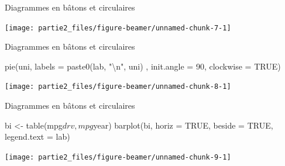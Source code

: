 \documentclass[12pt,ignorenonframetext,]{beamer}
\newenvironment{Shaded}{}{}
\newcommand{\KeywordTok}[1]{\textcolor[rgb]{0.00,0.00,1.00}{#1}}
\newcommand{\DataTypeTok}[1]{#1}
\newcommand{\DecValTok}[1]{#1}
\newcommand{\CharTok}[1]{\textcolor[rgb]{0.00,0.50,0.50}{#1}}
\newcommand{\StringTok}[1]{\textcolor[rgb]{0.00,0.50,0.50}{#1}}
\newcommand{\OtherTok}[1]{\textcolor[rgb]{1.00,0.25,0.00}{#1}}
\newcommand{\OperatorTok}[1]{#1}
\newcommand{\NormalTok}[1]{#1}
\renewenvironment{Shaded}{\begin{snugshade}}{\end{snugshade}}
\begin{document}
\begin{frame}[fragile]{Diagrammes en bâtons et circulaires}

\centering \footnotesize

\begin{Shaded}
\end{Shaded}

\texttt{[image: partie2\_files/figure-beamer/unnamed-chunk-7-1]}

\end{frame}

\begin{frame}[fragile]{Diagrammes en bâtons et circulaires}

\centering \footnotesize

\begin{Shaded}
\begin{Highlighting}[]
\KeywordTok{pie}\NormalTok{(uni, }\DataTypeTok{labels =} \KeywordTok{paste0}\NormalTok{(lab, }\StringTok{"}\CharTok{\textbackslash{}n}\StringTok{"}\NormalTok{, uni)}
\NormalTok{    , }\DataTypeTok{init.angle =} \DecValTok{90}\NormalTok{, }\DataTypeTok{clockwise =} \OtherTok{TRUE}\NormalTok{)}
\end{Highlighting}
\end{Shaded}

\texttt{[image: partie2\_files/figure-beamer/unnamed-chunk-8-1]}

\end{frame}

\begin{frame}[fragile]{Diagrammes en bâtons et circulaires}

\centering \footnotesize

\begin{Shaded}
\begin{Highlighting}[]
\NormalTok{bi <-}\StringTok{ }\KeywordTok{table}\NormalTok{(mpg}\OperatorTok{$}\NormalTok{drv, mpg}\OperatorTok{$}\NormalTok{year)}
\KeywordTok{barplot}\NormalTok{(bi, }\DataTypeTok{horiz =} \OtherTok{TRUE}\NormalTok{, }\DataTypeTok{beside =} \OtherTok{TRUE}\NormalTok{, }\DataTypeTok{legend.text =}\NormalTok{ lab)}
\end{Highlighting}
\end{Shaded}

\texttt{[image: partie2\_files/figure-beamer/unnamed-chunk-9-1]}

\end{frame}
\end{document}
